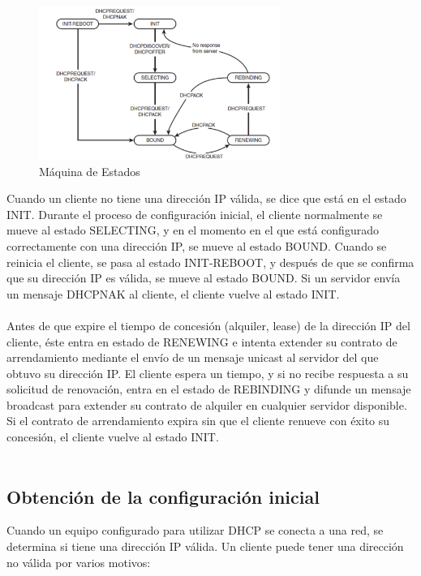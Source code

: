 \begin{figure}
  \centering
    \includegraphics[width=0.7\textwidth]{img/maquinaEstados}
  \caption{Máquina de Estados}
  \label{fig:1}
\end{figure}

Cuando un cliente no tiene una dirección IP válida, se dice que está en el estado INIT. Durante el proceso de configuración inicial, el cliente normalmente se mueve al estado SELECTING, y en el momento en el que está configurado correctamente con una dirección IP, se mueve al estado BOUND. Cuando se reinicia el cliente, se pasa al estado INIT-REBOOT, y después de que se confirma que su dirección IP es válida, se mueve al estado BOUND. Si un servidor envía un mensaje DHCPNAK al cliente, el cliente vuelve al estado INIT.\\\\
Antes de que expire el tiempo de concesión (alquiler, lease) de la dirección IP del cliente, éste entra en estado de RENEWING e intenta extender su contrato de arrendamiento mediante el envío de un mensaje unicast al servidor del que obtuvo su dirección IP. El cliente espera un tiempo, y si no recibe respuesta a su solicitud de renovación, entra en el estado de REBINDING y difunde un mensaje broadcast para extender su contrato de alquiler en cualquier servidor disponible. Si el contrato de arrendamiento expira sin que el cliente renueve con éxito su concesión, el cliente vuelve al estado INIT.\\\\

\subsection{Obtención de la configuración inicial}
	Cuando un equipo configurado para utilizar DHCP se conecta a una red, se determina si tiene una dirección IP válida. Un cliente puede tener una dirección no válida por varios motivos:
	
